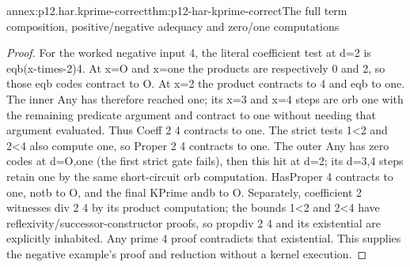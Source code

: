 \begin{annexitem}{annex:p12.har.kprime-correct}{thm:p12-har-kprime-correct}{The full term composition, positive/negative adequacy and zero/one computations}
\begin{proof}
For the worked negative input 4, the literal coefficient test at d=2
is eqb(x-times-2)4. At x=O and x=one the products are respectively
0 and 2, so those eqb codes contract to O. At x=2 the product
contracts to 4 and eqb to one. The inner Any has therefore reached
one; its x=3 and x=4 steps are orb one with the remaining predicate
argument and contract to one without needing that argument evaluated.
Thus Coeff 2 4 contracts to one. The strict tests 1<2 and 2<4 also
compute one, so Proper 2 4 contracts to one. The outer Any has zero
codes at d=O,one (the first strict gate fails), then this hit at d=2;
its d=3,4 steps retain one by the same short-circuit orb computation.
HasProper 4 contracts to one, notb to O, and the final KPrime andb
to O. Separately, coefficient 2 witnesses div 2 4 by its product
computation; the bounds 1<2 and 2<4 have reflexivity/successor-constructor
proofs, so propdiv 2 4 and its existential are explicitly inhabited.
Any prime 4 proof contradicts that existential. This supplies the
negative example's proof and reduction without a kernel execution.
\end{proof}
\end{annexitem}

